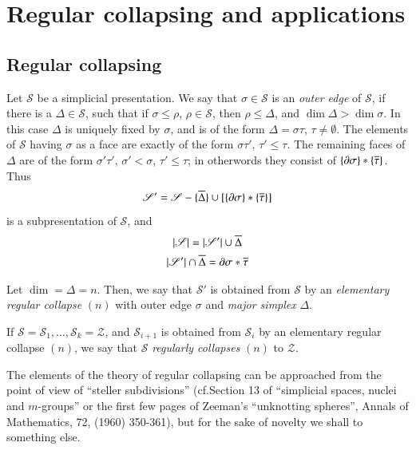 
\chapter{Regular collapsing and applications}\label{chap7}

\section{Regular collapsing}\label{chap7-sec7.1}\pageoriginale
Let $\mathscr{S}$ be a simplicial presentation. We say that $\sigma \in \mathscr{S}$ is an {\em outer edge} of $\mathscr{S}$, if there is a $\Delta\in \mathscr{S}$, such that if $\sigma\leq \rho$, $\rho\in\mathscr{S}$, then $\rho\leq \Delta$, and $\dim \Delta >\dim \sigma$. In this case $\Delta$ is uniquely fixed by $\sigma$, and is of the form $\Delta =\sigma\tau$, $\tau\neq \emptyset$. The elements of $\mathscr{S}$ having $\sigma$ as a face are exactly of the form $\sigma\tau'$, $\tau'\leq \tau$. The remaining faces of $\Delta$ are of the form $\sigma'\tau'$, $\sigma'<\sigma$, $\tau'\leq \tau$; in otherwords they consist of $\{\partial \sigma\}\ast\{\overline{\tau}\}$. Thus 
$$
\mathscr{S}'=\mathscr{S}-\{\overline{\Delta}\}\cup [\{\partial \sigma\}\ast\{\overline{\tau}\}]
$$
is a subpresentation of $\mathscr{S}$, and 
\begin{gather*}
|\mathscr{S}|=|\mathscr{S}'|\cup \overline{\Delta}\\
|\mathscr{S}'|\cap \overline{\Delta}=\partial \sigma\ast\overline{\tau}
\end{gather*}

Let $\dim =\Delta=n$. Then, we say that $\mathscr{S}'$ is obtained from $\mathscr{S}$ by an {\em elementary regular collapse} $(n)$ with outer edge $\sigma$ and {\em major simplex} $\Delta$.

If $\mathscr{S}=\mathscr{S}_{1},\ldots,\mathscr{S}_{k}=\mathscr{Z}$, and $\mathscr{S}_{i+1}$ is obtained from $\mathscr{S}_{i}$ by an elementary regular collapse $(n)$, we say that $\mathscr{S}$ {\em regularly collapses} $(n)$ to $\mathscr{Z}$. 

The elements of the theory of regular collapsing can be approached from the point of view of ``steller subdivisions'' (cf.\@ Section 13 of ``simplicial spaces, nuclei and $m$-groups'' or the first few pages of Zeeman's ``unknotting spheres'', Annals of Mathematics, 72, (1960) 350-361), but for the sake of novelty we shall to something else. 

